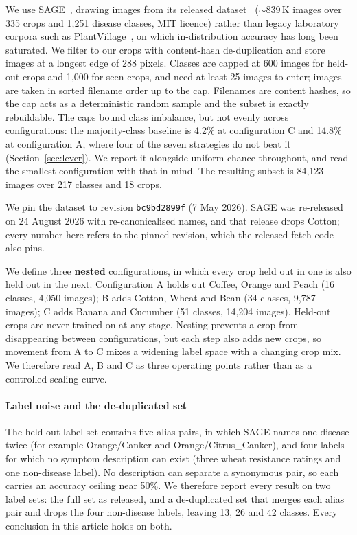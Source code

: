 \documentclass[a4paper,fleqn]{cas-dc}
\begin{document}
We use SAGE~\citep{arshad2026sage}, drawing images from its released dataset~\citep{sagedata2026}
($\sim$839\,K images over 335 crops and 1{,}251 disease classes, MIT licence) rather than legacy
laboratory corpora such as PlantVillage~\citep{mohanty2016}, on which in-distribution accuracy has
long been saturated. We filter to our crops with content-hash de-duplication and store images at a
longest edge of 288 pixels. Classes are capped at 600 images for held-out crops and 1{,}000 for seen
crops, and need at least 25 images to enter; images are taken in sorted filename order up to the
cap. Filenames are content hashes, so the cap acts as a deterministic random sample and the subset
is exactly rebuildable. The caps bound class imbalance, but not evenly across configurations: the
majority-class baseline is 4.2\% at configuration C and 14.8\% at configuration A, where four of the
seven strategies do not beat it (Section~\ref{sec:lever}). We report it alongside uniform chance
throughout, and read the smallest configuration with that in mind. The resulting subset is
84{,}123 images over 217 classes and 18 crops.

We pin the dataset to revision \texttt{bc9bd2899f} (7 May 2026). SAGE was re-released on 24 August
2026 with re-canonicalised names, and that release drops Cotton; every number here refers to the
pinned revision, which the released fetch code also pins.

We define three \textbf{nested} configurations, in which every crop held out in one is also held out
in the next. Configuration A holds out Coffee, Orange and Peach (16 classes, 4{,}050 images);
B adds Cotton, Wheat and Bean (34 classes, 9{,}787 images); C adds Banana and Cucumber (51 classes,
14{,}204 images). Held-out crops are never trained on at any stage. Nesting prevents a crop from
disappearing between configurations, but each step also adds new crops, so movement from A to C
mixes a widening label space with a changing crop mix. We therefore read A, B and C as three
operating points rather than as a controlled scaling curve.

\paragraph{Label noise and the de-duplicated set} The held-out label set contains five alias
pairs, in which SAGE names one disease twice (for example Orange/Canker and Orange/Citrus\_Canker),
and four labels for which no symptom description can exist (three wheat resistance ratings and one
non-disease label). No description can separate a synonymous pair, so each carries an accuracy
ceiling near 50\%. We therefore report every result on two label sets: the full set as released, and
a de-duplicated set that merges each alias pair and drops the four non-disease labels, leaving 13, 26
and 42 classes. Every conclusion in this article holds on both.
\end{document}
